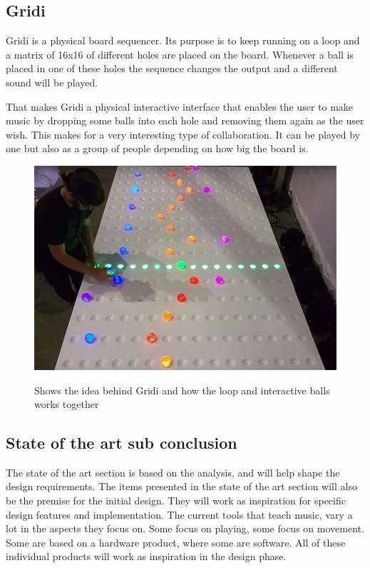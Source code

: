 \subsection{Gridi}
Gridi is a physical board sequencer. Its purpose is to keep running on a loop and a matrix of 16x16 of different holes are placed on the board. Whenever a ball is placed in one of these holes the sequence changes the output and a different sound will be played. 

That makes Gridi a physical interactive interface that enables the user to make music by dropping some balls into each hole and removing them again as the user wish. This makes for a very interesting type of collaboration. It can be played by one but also as a group of people depending on how big the board is. \cite{Gridi}
\begin{figure}[H]
	\centering
	\includegraphics[width=0.7\linewidth]{figure/Analysis/gridi}
	\label{fig:Gridi}
	\caption{Shows the idea behind Gridi and how the loop and interactive balls works together \cite{Gridi}}
\end{figure}



	 
\subsection{State of the art sub conclusion}
The state of the art section is based on the analysis, and will help shape the design requirements. The items presented in the state of the art section will also be the premise for the initial design. They will work as inspiration for specific design features and implementation. The current tools that teach music, vary a lot in the aspects they focus on. Some focus on playing, some focus on movement. Some are based on a hardware product, where some are software. All of these individual products will work as inspiration in the design phase.



